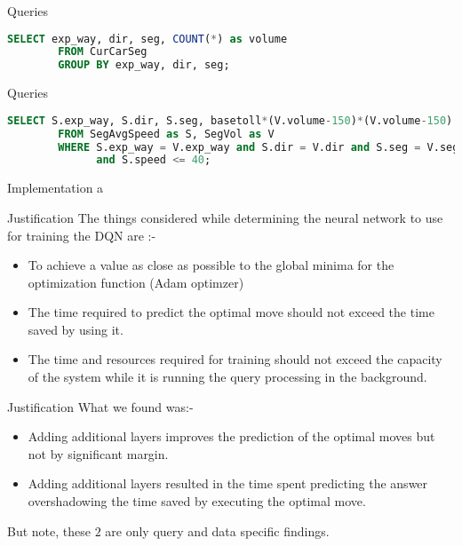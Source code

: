 \begin{frame}[fragile]{Queries}
    \begin{lstlisting}[language=SQL, caption= SEGVOL linear road query]
        SELECT exp_way, dir, seg, COUNT(*) as volume
        FROM CurCarSeg
        GROUP BY exp_way, dir, seg;
    \end{lstlisting}
\end{frame}

\begin{frame}[fragile]{Queries}
    \begin{lstlisting}[language=SQL, caption= SEGTOLL linear road query]
        SELECT S.exp_way, S.dir, S.seg, basetoll*(V.volume-150)*(V.volume-150)
        FROM SegAvgSpeed as S, SegVol as V
        WHERE S.exp_way = V.exp_way and S.dir = V.dir and S.seg = V.seg
              and S.speed <= 40;
    \end{lstlisting}
\end{frame}

\begin{frame}{Implementation}
a
\end{frame}

\begin{frame}{Justification}
The things considered while determining the neural network to use for training the DQN are :-
    \begin{itemize}[<+->]
        \item To achieve a value as close as possible to the global minima for the optimization function (Adam optimzer)
        \item The time required to predict the optimal move should not exceed the time saved by using it.
        \item The time and resources required for training should not exceed the capacity of the system while it is running the query processing in the background. 
    \end{itemize}
\end{frame}

\begin{frame}{Justification}
    What we found was:-
    \begin{itemize}[<+->]
        \item Adding additional layers improves the prediction of the optimal moves but not by significant margin.
        \item Adding additional layers resulted in the time spent predicting the answer overshadowing the time saved by executing the optimal move.
    \end{itemize}
But note, these $2$ are only query and data specific findings.
\end{frame}


